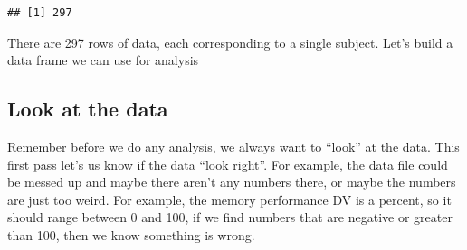 \documentclass[
]{book}
\newenvironment{Shaded}{\begin{snugshade}}{\end{snugshade}}
\newcommand{\AttributeTok}[1]{\textcolor[rgb]{0.77,0.63,0.00}{#1}}
\newcommand{\DecValTok}[1]{\textcolor[rgb]{0.00,0.00,0.81}{#1}}
\newcommand{\FunctionTok}[1]{\textcolor[rgb]{0.00,0.00,0.00}{#1}}
\newcommand{\NormalTok}[1]{#1}
\newcommand{\OtherTok}[1]{\textcolor[rgb]{0.56,0.35,0.01}{#1}}
\newcommand{\SpecialCharTok}[1]{\textcolor[rgb]{0.00,0.00,0.00}{#1}}
\newcommand{\StringTok}[1]{\textcolor[rgb]{0.31,0.60,0.02}{#1}}
\begin{document}
\begin{Shaded}
\end{Shaded}

\begin{verbatim}
## [1] 297
\end{verbatim}

There are 297 rows of data, each corresponding to a single subject. Let's build a data frame we can use for analysis

\begin{Shaded}
\end{Shaded}

\hypertarget{look-at-the-data-5}{%
\subsection{Look at the data}\label{look-at-the-data-5}}

Remember before we do any analysis, we always want to ``look'' at the data. This first pass let's us know if the data ``look right''. For example, the data file could be messed up and maybe there aren't any numbers there, or maybe the numbers are just too weird. For example, the memory performance DV is a percent, so it should range between 0 and 100, if we find numbers that are negative or greater than 100, then we know something is wrong.
\end{document}
